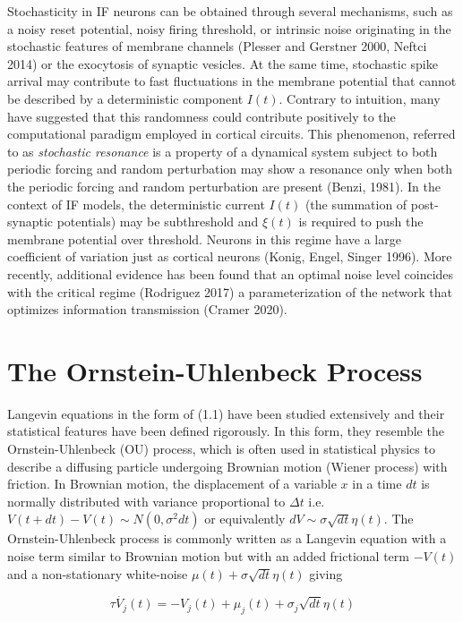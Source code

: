 \documentclass{ucetd}
\begin{document}
Stochasticity in IF neurons can be obtained through several mechanisms, such as a noisy reset potential, noisy firing threshold, or intrinsic noise originating in the stochastic features of membrane channels (Plesser and Gerstner 2000, Neftci 2014) or the exocytosis of synaptic vesicles. At the same time, stochastic spike arrival may contribute to fast fluctuations in the membrane potential that cannot be described by a deterministic component $I(t)$. Contrary to intuition, many have suggested that this randomness could contribute positively to the computational paradigm employed in cortical circuits. This phenomenon, referred to as \emph{stochastic resonance} is a property of a dynamical system subject to both periodic forcing and random perturbation may show a resonance only when both the periodic forcing and random perturbation are present (Benzi, 1981). In the context of IF models, the deterministic current $I(t)$ (the summation of post-synaptic potentials) may be subthreshold and $\xi(t)$ is required to push the membrane potential over threshold. Neurons in this regime have a large coefficient of variation just as cortical neurons (Konig, Engel, Singer 1996). More recently, additional evidence has been found that an optimal noise level coincides with the critical regime (Rodriguez 2017) a parameterization of the network that optimizes information transmission (Cramer 2020).

\section{The Ornstein-Uhlenbeck Process}

Langevin equations in the form of (1.1) have been studied extensively and their statistical features have been defined rigorously. In this form, they resemble the Ornstein-Uhlenbeck (OU) process, which is often used in statistical physics to describe a diffusing particle undergoing Brownian motion (Wiener process) with friction. In Brownian motion, the displacement of a variable $x$ in a time $dt$ is normally distributed with variance proportional to $\Delta t$ i.e. $V(t+dt) - V(t) \sim N(0, \sigma^{2}dt)$ or equivalently $dV \sim \sigma\sqrt{dt}\eta(t)$. The Ornstein-Uhlenbeck process is commonly written as a Langevin equation with a noise term similar to Brownian motion but with an added frictional term $-V(t)$ and a non-stationary white-noise $\mu(t) + \sigma\sqrt{dt}\eta(t)$ giving


\begin{equation}
\tau\dot{V_{j}}(t) = -V_{j}(t) + \mu_{j}(t) + \sigma_{j}\sqrt{dt}\eta(t)
\end{equation}
\end{document}
